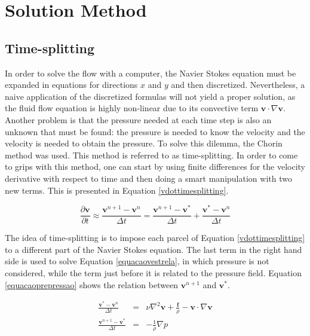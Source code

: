 \documentclass[journal]{IEEEtran}
\begin{document}
\section{Solution Method}
\subsection{Time-splitting}
In order to solve the flow with a computer, the Navier Stokes equation must be expanded in equations for directions $x$ and $y$ and then discretized. Nevertheless, a naive application of the discretized formulas will not yield a proper solution, as the fluid flow equation is highly non-linear due to its convective term $\mathbf{v}\cdot \nabla \mathbf{v}$. Another problem is that the pressure needed at each time step is also an unknown that must be found: the pressure is needed to know the velocity and the velocity is needed to obtain the pressure. To solve this dilemma, the Chorin method \cite{Chorin1997118} was used. This method is referred to as time-splitting. In order to come to grips with this method, one can start by using finite differences for the velocity derivative with respect to time and then doing a smart manipulation with two new terms. This is presented in Equation \ref{vdottimesplitting}.

\begin{equation}
\frac{\partial \textbf{v}}{\partial t}\approx \frac{\textbf{v}^{n+1}-\textbf{v}^n}{\Delta t}=\frac{\textbf{v}^{n+1}-\textbf{v}^*}{\Delta t}+\frac{\textbf{v}^{*}-\textbf{v}^n}{\Delta t} \label{vdottimesplitting}
\end{equation}

The idea of time-splitting is to impose each parcel of Equation \ref{vdottimesplitting} to a different part of the Navier Stokes equation. The last term in the right hand side is used to solve Equation \ref{equacaovestrela}, in which pressure is not considered, while the term just before it is related to the pressure field. Equation \ref{equacaoprepressao} shows the relation between $\mathbf{v}^{n+1}$ and $\mathbf{v}^{*}$. 

\begin{eqnarray}
\frac{\textbf{v}^{*}-\textbf{v}^n}{\Delta t}&=& \nu\nabla ^2 \textbf{v} + \frac{\textbf{f}}{\rho} - \textbf{v}\cdot \nabla \textbf{v}\label{equacaovestrela}\\
\frac{\textbf{v}^{n+1}-\textbf{v}^*}{\Delta t}&=&-\frac{1}{\rho}\nabla p\label{equacaoprepressao}
\end{eqnarray}
\end{document}
